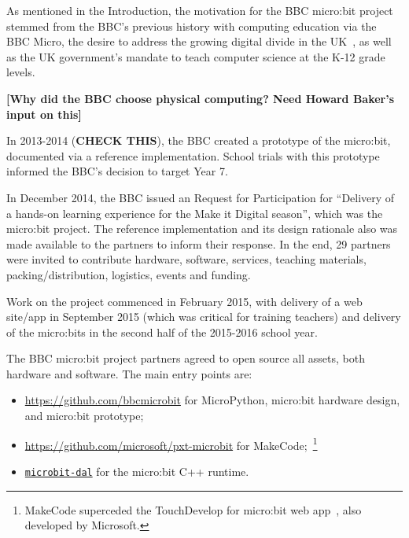 As mentioned in the Introduction, the motivation for the BBC micro:bit project
stemmed from the BBC's previous history with computing education via the BBC Micro, 
the desire to address the growing digital divide in the UK~\cite{XYZ},
as well as the UK government's mandate to teach computer science at the K-12 grade levels.

{\bf [Why did the BBC choose physical computing? Need Howard Baker's input on this]}

In 2013-2014 ({\bf CHECK THIS}), the BBC created a prototype of the micro:bit, 
documented via a reference implementation. School trials with this prototype 
informed the BBC's decision to target Year 7. 

In December 2014, the BBC issued an Request for Participation
for ``Delivery of a hands-on learning experience for the Make it Digital season'',
which was the micro:bit project.
The reference implementation and
its design rationale also was made available to the partners to inform
their response.
In the end, 29 partners were invited to contribute hardware, software, services,
teaching materials, packing/distribution, logistics, events and funding.

Work on the project commenced in February 2015, with delivery of
a web site/app in September 2015 (which was critical
for training teachers) and delivery of the micro:bits in the second
half of the 2015-2016 school year.

The BBC micro:bit project partners agreed to open source all assets, both
hardware and software. The main entry points are:
\begin{itemize}
\item \url{https://github.com/bbcmicrobit} for MicroPython, micro:bit hardware design, and micro:bit prototype;
\item \url{https://github.com/microsoft/pxt-microbit} for MakeCode;~\footnote{
MakeCode superceded the TouchDevelop for micro:bit web app~\cite{ball2016microsoft}, also developed by Microsoft.}
\item {\tt \href{https://github.com/lancaster-university/microbit-dal}{microbit-dal}}             for the micro:bit
C++ runtime.
\end{itemize}

